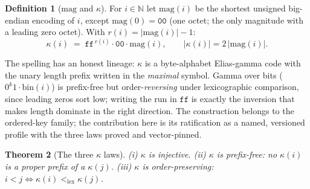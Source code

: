 \documentclass[11pt]{article}
\newtheorem{theorem}{Theorem}[section]
\theoremstyle{definition}
\newtheorem{definition}[theorem]{Definition}
\newcommand{\lex}{<_{\mathrm{lex}}}
\newcommand{\magn}{\mathrm{mag}}
\begin{document}
\begin{definition}[$\magn$ and $\kappa$]\label{def:kappa}
For $i \in \mathbb{N}$ let $\magn(i)$ be the shortest unsigned big-endian encoding of
$i$, except $\magn(0) = \mathtt{00}$ (one octet; the only magnitude with a leading
zero octet). With $r(i) = |\magn(i)| - 1$:
\[
\kappa(i) \;=\; \mathtt{ff}^{\,r(i)} \cdot \mathtt{00} \cdot \magn(i),
\qquad |\kappa(i)| = 2\,|\magn(i)|.
\]
\end{definition}

The spelling has an honest lineage: $\kappa$ is a byte-alphabet Elias-gamma code
\cite{elias} with the unary length prefix written in the \emph{maximal} symbol.
Gamma over bits ($0^{k}1 \cdot \mathrm{bin}(i)$) is prefix-free but
order-\emph{reversing} under lexicographic comparison, since leading zeros sort low;
writing the run in $\mathtt{ff}$ is exactly the inversion that makes length dominate
in the right direction. The construction belongs to the ordered-key family; the
contribution here is its ratification as a named, versioned profile with the three
laws proved and vector-pinned.

\begin{theorem}[The three $\kappa$ laws]\label{thm:kappa}
\emph{(i)} $\kappa$ is injective.
\emph{(ii)} $\kappa$ is prefix-free: no $\kappa(i)$ is a proper prefix of a
$\kappa(j)$.
\emph{(iii)} $\kappa$ is order-preserving: $i < j \iff \kappa(i) \lex \kappa(j)$.
\end{theorem}
\end{document}
